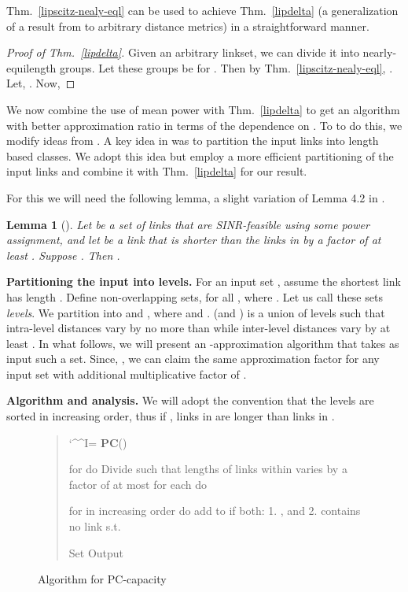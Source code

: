 \documentclass[11pt]{amsart}
\newcommand{\prob}[1]{\textsf{#1}}  \newcommand{\myparagraph}[1]{\smallskip\noindent\textbf{#1}\quad}
\newcommand{\alg}[1]{\textbf{#1}}
\newlength{\tablength}
\newlength{\spacelength}
\newcommand{\tabstar}{\hspace*{\tablength}}
\newcommand{\spacestar}{\hspace*{\spacelength}}
\def\obeytabs{\catcode`\^^I=\active}
{\obeytabs\global\let^^I=\tabstar}
{\obeyspaces\global\let =\spacestar}
\newenvironment{display}{\begingroup\obeylines\obeyspaces\obeytabs}{\endgroup}
\newenvironment{prog}{\begin{display}\parskip0pt\sf}{\end{display}}
\newenvironment{pseudo}{\begin{quote}\begin{prog}}{\end{prog}\end{quote}}
\newcounter{foo}
\newtheorem{lemma}[foo]{Lemma}
\begin{document}
Thm.~\ref{lipscitz-nealy-eql} can be used to achieve Thm.~\ref{lipdelta} (a generalization of a result from \cite{us:esa09full} to arbitrary distance metrics)
in a straightforward manner.

\begin{proof}[Proof of Thm.~\ref{lipdelta}]
Given an arbitrary linkset, we can divide it into 
nearly-equilength groups. Let these groups be  for .
Then by Thm.~\ref{lipscitz-nealy-eql}, . Let, 
. Now,

\end{proof}

We now combine the use of mean power  with Thm.~\ref{lipdelta}
to get an algorithm with better approximation
ratio in terms of the dependence on .
To to do this, we modify ideas from \cite{us:esa09full}.
A key idea in  \cite{us:esa09full} was to partition the input links into length based
classes. We adopt this idea but employ a more efficient partitioning of the input links
and combine it with Thm.~\ref{lipdelta} for our result.

For this we will need the following lemma, a slight variation of 
Lemma 4.2 in \cite{us:esa09full}.

\begin{lemma}[\cite{us:esa09full}]
\label{wellsep}
Let  be a set of links that are SINR-feasible using some power assignment, and let
 be a link that is shorter than the links in  by a factor of at least . Suppose 
. Then .
\end{lemma}


\myparagraph{Partitioning the input into levels.}
For an input set , assume the shortest link has length . Define non-overlapping sets,
 for all , 
where . Let us call these sets \emph{levels}. 
We partition  into  and , where
 and .
 (and ) is a union of levels such that intra-level distances
vary by no more than  while inter-level distances vary by at least
. In what follows, we will present an -approximation algorithm that takes as input such a
set. Since, , we can claim the same approximation
factor for any input set with additional multiplicative factor of .


\myparagraph{Algorithm and analysis.} 
We will adopt the convention that the levels are sorted in increasing
order, thus if , links in  are longer than links in .

\begin{figure}[htbp]
\begin{pseudo}
  \alg{PC}()
     
     for  do
       Divide  such that lengths 
          of links within  varies by a 
          factor of at most 
       for each  do
           
           for  in increasing order do
                add  to  if both:
                     1. , and
                     2.  contains no link  s.t. 
                         
       
       Set 
     Output 
\end{pseudo}
\caption{Algorithm for \prob{PC-capacity}}
\end{figure}
\end{document}
